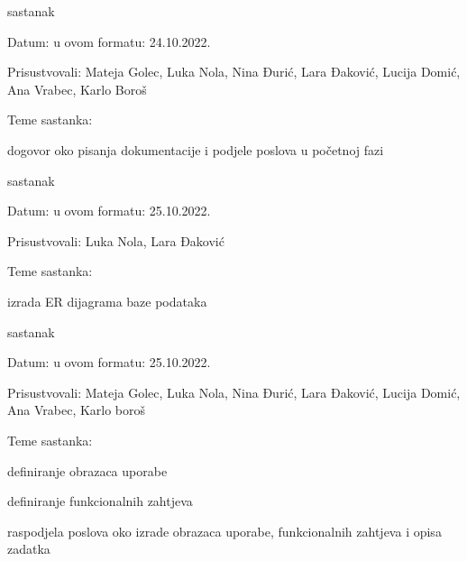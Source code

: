 \begin{packed_enum}
			\item  sastanak
			\item[] \begin{packed_item}
				\item Datum: u ovom formatu: 24.10.2022.
				\item Prisustvovali: Mateja Golec, Luka Nola, Nina Đurić, Lara Đaković, Lucija Domić, Ana Vrabec, Karlo Boroš
				\item Teme sastanka:
				\begin{packed_item}
					\item  dogovor oko pisanja dokumentacije i podjele poslova u početnoj fazi
				\end{packed_item}
			\end{packed_item}
			
			\item  sastanak
			\item[] \begin{packed_item}
				\item Datum: u ovom formatu: 25.10.2022.
				\item Prisustvovali: Luka Nola, Lara Đaković
				\item Teme sastanka:
				\begin{packed_item}
					\item  izrada ER dijagrama baze podataka
				\end{packed_item}
			\end{packed_item}

			\item  sastanak
			\item[] \begin{packed_item}
				\item Datum: u ovom formatu: 25.10.2022.
				\item Prisustvovali: Mateja Golec, Luka Nola, Nina Đurić, Lara Đaković, Lucija Domić, Ana Vrabec, Karlo boroš
				\item Teme sastanka:
				\begin{packed_item}
					\item  definiranje obrazaca uporabe
					\item  definiranje funkcionalnih zahtjeva
					\item  raspodjela poslova oko izrade obrazaca uporabe, funkcionalnih zahtjeva i opisa zadatka
				\end{packed_item}
			\end{packed_item}


\end{packed_enum}
